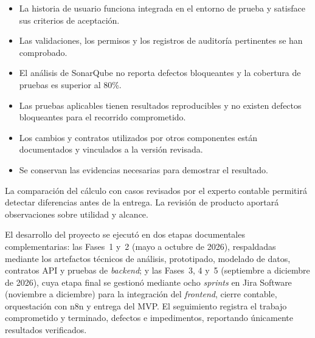 \begin{itemize}[leftmargin=*]
  \item La historia de usuario funciona integrada en el entorno de prueba y satisface sus criterios de aceptación.
  \item Las validaciones, los permisos y los registros de auditoría pertinentes se han comprobado.
  \item El análisis de SonarQube no reporta defectos bloqueantes y la cobertura de pruebas es superior al 80\%.
  \item Las pruebas aplicables tienen resultados reproducibles y no existen defectos bloqueantes para el recorrido comprometido.
  \item Los cambios y contratos utilizados por otros componentes están documentados y vinculados a la versión revisada.
  \item Se conservan las evidencias necesarias para demostrar el resultado.
\end{itemize}

La comparación del cálculo con casos revisados por el experto contable permitirá detectar diferencias antes de la entrega. 
La revisión de producto aportará observaciones sobre utilidad y alcance. 



El desarrollo del proyecto se ejecutó en dos etapas documentales complementarias: 
las Fases~1 y~2 (mayo a octubre de 2026), respaldadas mediante los artefactos técnicos de análisis, 
prototipado, modelado de datos, contratos API y pruebas de \textit{backend}; 
y las Fases~3, 4 y~5 (septiembre a diciembre de 2026),
cuya etapa final se gestionó mediante ocho \textit{sprints} en Jira Software (noviembre a diciembre) para la integración del \textit{frontend},
cierre contable, orquestación con n8n y entrega del MVP. El seguimiento registra el trabajo comprometido y terminado, 
defectos e impedimentos, reportando únicamente resultados verificados.
